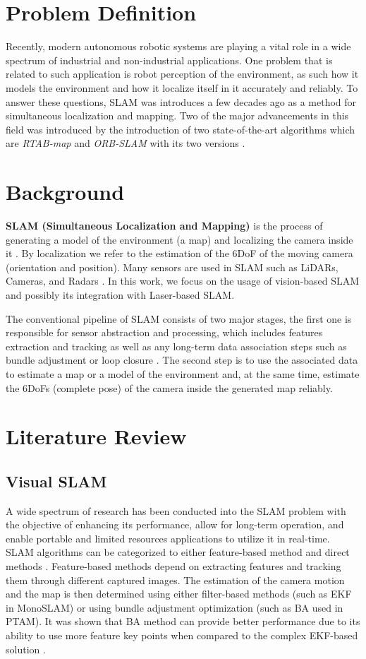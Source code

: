 \documentclass[12pt]{article}
\begin{document}
\section{Problem Definition}
Recently, modern autonomous robotic systems are playing a vital role in a wide spectrum of industrial and non-industrial applications. One problem that is related to such application is robot perception of the environment, as such how it models the environment and how it localize itself in it accurately and reliably. To answer these questions, SLAM was introduces a few decades ago as a method for simultaneous localization and mapping. Two of the major advancements in this field was introduced by the introduction of two state-of-the-art algorithms which are \textit{RTAB-map} \cite{labbe2019rtab} and \textit{ORB-SLAM} with its two versions \cite{mur2015orb}\cite{mur2017orb}.
\section{Background}
\indent \textbf{SLAM (Simultaneous Localization and Mapping)} is the process of generating a model of the environment (a map) and localizing the camera inside it \cite{cadena2016past}. By localization we refer to the estimation of the 6DoF of the moving camera (orientation and position). Many sensors are used in SLAM such as LiDARs, Cameras, and Radars \cite{bresson2017simultaneous}. In this work, we focus on the usage of vision-based SLAM and possibly its integration with Laser-based SLAM.

The conventional pipeline of SLAM consists of two major stages, the first one is responsible for sensor abstraction and processing, which includes features extraction and tracking as well as any long-term data association steps such as bundle adjustment or loop closure \cite{bresson2017simultaneous}\cite{cadena2016past}. The second step is to use the associated data to estimate a map or a model of the environment and, at the same time, estimate the 6DoFs (complete pose) of the camera inside the generated map reliably. 
\section{Literature Review}
\subsection{Visual SLAM}
\indent A wide spectrum of research has been conducted into the SLAM problem with the objective of enhancing its performance, allow for long-term operation, and enable portable and limited resources applications to utilize it in real-time. SLAM algorithms can be categorized to either feature-based method and direct methods \cite{taketomi2017visual}. Feature-based methods depend on extracting features and tracking them through different captured images. The estimation of the camera motion and the map is then determined using either filter-based methods (such as EKF in MonoSLAM) or using bundle adjustment optimization (such as BA used in PTAM). It was shown that BA method can provide better performance due to its ability to use more feature key points when compared to the complex EKF-based solution \cite{strasdat2012visual}. 
\end{document}
